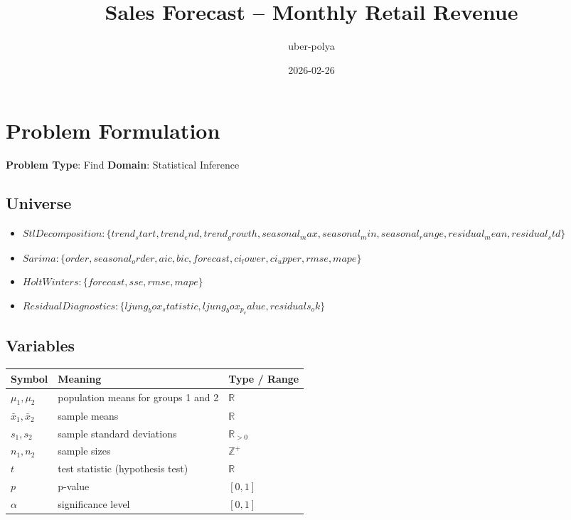\documentclass[11pt, a4paper]{article}
\title{Sales Forecast -- Monthly Retail Revenue}
\author{uber-polya}
\date{2026-02-26}
\begin{document}
\maketitle
\tableofcontents
\newpage

\section{Problem Formulation}

\begin{polyamodel}

\textbf{Problem Type}: Find \hfill
\textbf{Domain}: Statistical Inference


\end{polyamodel}

\subsection{Universe}

\begin{itemize}
  \item $Stl Decomposition: \{trend_start, trend_end, trend_growth, seasonal_max, seasonal_min, seasonal_range, residual_mean, residual_std\}$
  \item $Sarima: \{order, seasonal_order, aic, bic, forecast, ci_lower, ci_upper, rmse, mape\}$
  \item $Holt Winters: \{forecast, sse, rmse, mape\}$
  \item $Residual Diagnostics: \{ljung_box_statistic, ljung_box_p_value, residuals_ok\}$
\end{itemize}

\subsection{Variables}

\begin{longtable}{lll}
\toprule
\textbf{Symbol} & \textbf{Meaning} & \textbf{Type / Range} \\
\midrule
\endhead
$\mu_1, \mu_2$ & population means for groups 1 and 2 & $\mathbb{{R}}$ \\
$\bar{{x}}_1, \bar{{x}}_2$ & sample means & $\mathbb{{R}}$ \\
$s_1, s_2$ & sample standard deviations & $\mathbb{{R}}_{{>0}}$ \\
$n_1, n_2$ & sample sizes & $\mathbb{{Z}}^+$ \\
$t$ & test statistic (hypothesis test) & $\mathbb{{R}}$ \\
$p$ & p-value & $[0, 1]$ \\
$\alpha$ & significance level & $[0, 1]$ \\
\bottomrule
\end{longtable}
\end{document}

